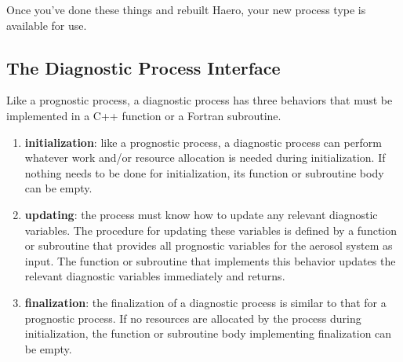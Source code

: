 
Once you've done these things and rebuilt Haero, your new process type is
available for use.

\subsection{The Diagnostic Process Interface}

Like a prognostic process, a diagnostic process has three behaviors that must be
implemented in a C++ function or a Fortran subroutine.

\begin{enumerate}
  \item {\bf initialization}: like a prognostic process, a diagnostic process
        can perform whatever work and/or resource allocation is needed during
        initialization. If nothing needs to be done for initialization, its
        function or subroutine body can be empty.
  \item {\bf updating}: the process must know how to update any relevant
        diagnostic variables. The procedure for updating these variables is
        defined by a function or subroutine that provides all prognostic
        variables for the aerosol system as input. The function or subroutine
        that implements this behavior updates the relevant diagnostic variables
        immediately and returns.
  \item {\bf finalization}: the finalization of a diagnostic process is similar
        to that for a prognostic process. If no resources are allocated by the
        process during initialization, the function or subroutine body
        implementing finalization can be empty.
\end{enumerate}

